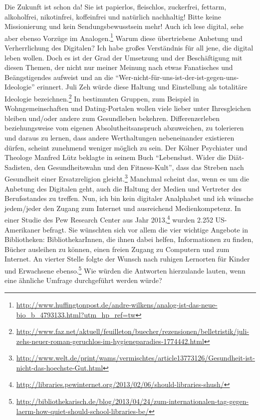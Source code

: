 \documentclass[a4paper,
fontsize=11pt,
oneside,
numbers=noperiodatend,
parskip=half-,
bibliography=totoc,
final
]{scrartcl}
\begin{document}
Die Zukunft ist schon da! Sie ist papierlos, fleischlos, zuckerfrei,
fettarm, alkoholfrei, nikotinfrei, koffeinfrei und natürlich nachhaltig!
Bitte keine Missionierung und kein Sendungsbewusstsein mehr! Auch ich
lese digital, sehe aber ebenso Vorzüge im Analogen.\footnote{\url{http://www.huffingtonpost.de/andre-wilkens/analog-ist-das-neue-bio\_b\_4793133.html?utm\_hp\_ref=tw}}
Warum diese übertriebene Anbetung und Verherrlichung des Digitalen? Ich
habe großes Verständnis für all jene, die digital leben wollen. Doch es
ist der Grad der Umsetzung und der Beschäftigung mit diesen Themen, der
nicht nur meiner Meinung nach etwas Fanatisches und Beängstigendes
aufweist und an die
\enquote{Wer-nicht-für-uns-ist-der-ist-gegen-uns-Ideologie} erinnert.
Juli Zeh würde diese Haltung und Einstellung als totalitäre Ideologie
bezeichnen.\footnote{\url{http://www.faz.net/aktuell/feuilleton/buecher/rezensionen/belletristik/juli-zehs-neuer-roman-geruchlos-im-hygieneparadies-1774442.html}}
In bestimmten Gruppen, zum Beispiel in Wohngemeinschaften und
Dating-Portalen wollen viele lieber unter Ihresgleichen bleiben und/oder
andere zum Gesundleben bekehren. Differenzerleben beziehungsweise vom
eigenen Absolutheitsanspruch abzuweichen, zu tolerieren und daraus zu
lernen, dass andere Werthaltungen nebeneinander existieren dürfen,
scheint zunehmend weniger möglich zu sein. Der Kölner Psychiater und
Theologe Manfred Lütz beklagte in seinem Buch \enquote{Lebenslust. Wider
die Diät-Sadisten, den Gesundheitswahn und den Fitness-Kult}, dass das
Streben nach Gesundheit einer Ersatzreligion gleicht.\footnote{\url{http://www.welt.de/print/wams/vermischtes/article13773126/Gesundheit-ist-nicht-das-hoechste-Gut.html}}
Manchmal scheint das, wenn es um die Anbetung des Digitalen geht, auch
die Haltung der Medien und Vertreter des Berufsstandes zu treffen. Nun,
ich bin kein digitaler Analphabet und ich wünsche jedem/jeder den Zugang
zum Internet und ausreichend Medienkompetenz. In einer Studie des Pew
Research Center aus Jahr 2013,\footnote{\url{http://libraries.pewinternet.org/2013/02/06/should-libraries-shush/}}
wurden 2.252 US-Amerikaner befragt. Sie wünschten sich vor allem die
vier wichtige Angebote in Bibliotheken: BibliothekarInnen, die ihnen
dabei helfen, Informationen zu finden, Bücher ausleihen zu können, einen
freien Zugang zu Computern und zum Internet. An vierter Stelle folgte
der Wunsch nach ruhigen Lernorten für Kinder und Erwachsene
ebenso.\footnote{\url{http://bibliothekarisch.de/blog/2013/04/24/zum-internationalen-tag-gegen-laerm-how-quiet-should-school-libraries-be/}}
Wie würden die Antworten hierzulande lauten, wenn eine ähnliche Umfrage
durchgeführt werden würde?
\end{document}
